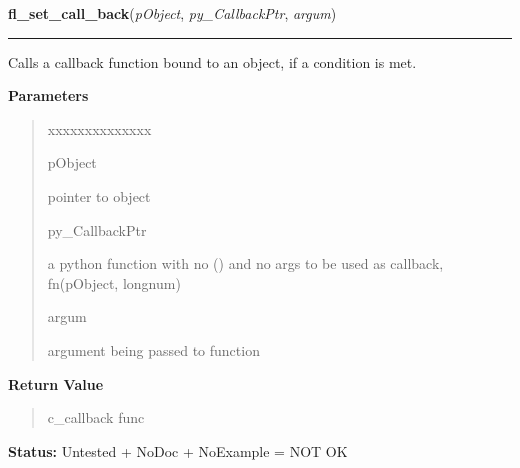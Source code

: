 \hspace{.8\funcindent}\begin{boxedminipage}{\funcwidth}

    \raggedright \textbf{fl\_set\_call\_back}(\textit{pObject}, \textit{py\_CallbackPtr}, \textit{argum})

    \vspace{-1.5ex}

    \rule{\textwidth}{0.5\fboxrule}
\setlength{\parskip}{2ex}
    Calls a callback function bound to an object, if a condition is met.

\setlength{\parskip}{1ex}
      \textbf{Parameters}
      \vspace{-1ex}

      \begin{quote}
        \begin{Ventry}{xxxxxxxxxxxxxx}

          \item[pObject]

          pointer to object

          \item[py\_CallbackPtr]

          a python function with no () and no args to be used as callback, 
          fn(pObject, longnum)

          \item[argum]

          argument being passed to function

        \end{Ventry}

      \end{quote}

      \textbf{Return Value}
    \vspace{-1ex}

      \begin{quote}
      c\_callback func

      \end{quote}

\textbf{Status:} Untested + NoDoc + NoExample = NOT OK



    \end{boxedminipage}

    \label{xformslib:library:fl_redraw_object}

    \vspace{0.5ex}

